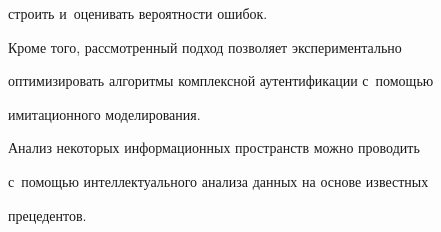 строить и~оценивать вероятности ошибок. 


  


  Кроме того, рассмотренный подход позволяет экспериментально 


оптимизировать алгоритмы комплексной аутентификации с~помощью 


имитационного моделирования. 


  


  Анализ некоторых информационных пространств можно проводить 


с~по\-мощью интеллектуального анализа данных на основе известных 


прецедентов.





\vspace*{-4pt}


  


